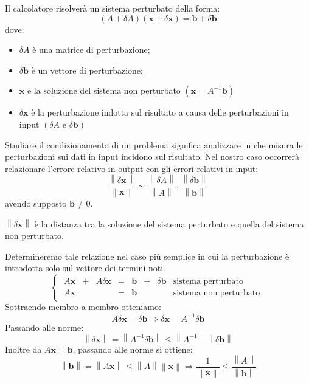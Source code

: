 \documentclass[12pt]{report}
\begin{document}
Il calcolatore risolverà un sistema perturbato della forma:
\[
(A + \delta A)(\mathbf{x} + \delta \mathbf{x}) = \mathbf{b} + \delta \mathbf{b}
\]
dove:
\begin{itemize}
	\item $\delta A$ è una matrice di perturbazione;
	\item $\delta\mathbf{b}$ è un vettore di perturbazione;
	\item $\mathbf{x}$ è la soluzione del sistema non perturbato $(\mathbf{x} = A^{-1}\mathbf{b})$
	\item $\delta\mathbf{x}$ è la perturbazione indotta sul risultato a causa delle perturbazioni in input $(\delta A \text{ e } \delta\mathbf{b})$
\end{itemize}
Studiare il condizionamento di un problema significa analizzare in che misura le perturbazioni sui dati in input incidono sul risultato. Nel nostro caso occorrerà relazionare l'errore relativo in output con gli errori relativi in input:
\[
\dfrac{\left\|\delta\mathbf{x}\right\|}{\left\|\mathbf{x}\right\|} \sim \dfrac{\left\|\delta A\right\|}{\left\|A\right\|}, \dfrac{\left\|\delta\mathbf{b}\right\|}{\left\|\mathbf{b}\right\|}
\]
avendo supposto $\mathbf{b} \neq 0$.
\begin{note}{}{}
$\left\|\delta\mathbf{x}\right\|$ è la distanza tra la soluzione del sistema perturbato e quella del sistema non perturbato.
\end{note}
Determineremo tale relazione nel caso più semplice in cui la perturbazione è introdotta solo sul vettore dei termini noti.
\[
\begin{cases}
	\begin{array}{rcrcrcrc}
	A\mathbf{x} & + & A\delta\mathbf{x} & = & \mathbf{b} & + & \delta\mathbf{b} & \text{sistema perturbato} \\
	A\mathbf{x} &  &  & = & \mathbf{b} & & & \text{sistema non perturbato}
	\end{array}
\end{cases}
\]
Sottraendo membro a membro otteniamo:
\[
A\delta\mathbf{x} = \delta\mathbf{b} \Rightarrow \delta\mathbf{x} = A^{-1}\delta\mathbf{b}
\]
Passando alle norme:
\[
\left\|\delta\mathbf{x}\right\| = \left\|A^{-1}\delta\mathbf{b}\right\| \leq \left\|A^{-1}\right\|\left\|\delta\mathbf{b}\right\|
\]
Inoltre da $A\mathbf{x} = \mathbf{b}$, passando alle norme si ottiene:
\[
\left\|\mathbf{b}\right\| = \left\|A\mathbf{x}\right\| \leq \left\|A\right\|\left\|\mathbf{x}\right\| \Rightarrow \dfrac{1}{\left\|\mathbf{x}\right\|} \leq \dfrac{\left\|A\right\|}{\left\|\mathbf{b}\right\|}
\]
\end{document}
